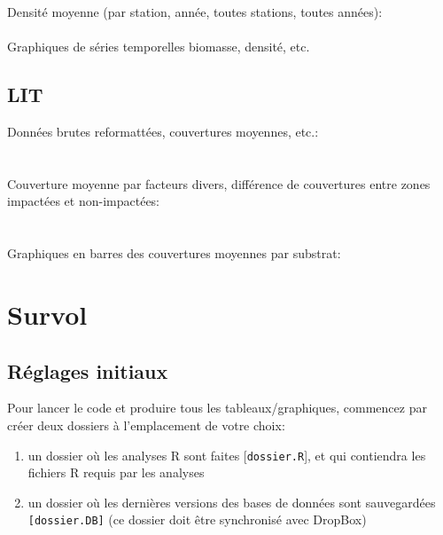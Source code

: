 \documentclass{article}
\begin{document}
\noindent Densité moyenne (par station, année, toutes stations, toutes années):\\
\hyperlink{p4} {}\\

\noindent Graphiques de séries temporelles biomasse, densité, etc.\\
\hyperlink{p5} {}

\subsection{LIT}
\noindent Données brutes reformattées, couvertures moyennes, etc.:\\
\hyperlink{l1} {}\\
\hyperlink{l2} {}\\

\noindent Couverture moyenne par facteurs divers, différence de
couvertures entre zones impactées et non-impactées:\\
\hyperlink{l3} {}\\
\hyperlink{l4} {}\\

\noindent Graphiques en barres des couvertures moyennes par substrat:\\
\hyperlink{l5} {}

\clearpage
\section{Survol}

\subsection{Réglages initiaux}
\label{reglages1}
Pour lancer le code et produire tous les tableaux/graphiques,
commencez par créer deux dossiers à l'emplacement de votre choix:

\begin{enumerate}
      \item un dossier où les analyses R sont faites
      [\texttt{dossier.R}], et qui contiendra les fichiers R requis par
      les analyses
  \item un dossier où les dernières versions des bases de données sont
    sauvegardées \texttt{[dossier.DB]} (ce dossier doit être
    synchronisé avec DropBox)
     \end{enumerate}
\end{document}
